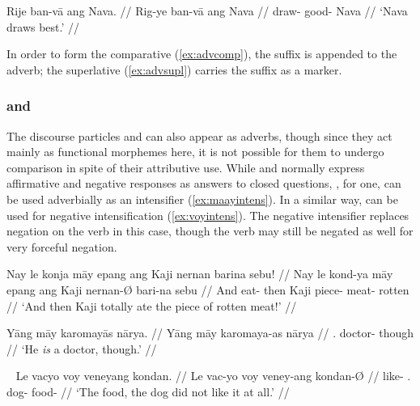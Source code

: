 \a\label{ex:advsupl}\begingl
	\gla Rije ban-vā ang Nava. //
	\glb Rig-ye ban-vā ang Nava //
	\glc draw-\TsgF{} good-\Supl{} \Aarg{} Nava //
	\glft `Nava draws best.' //
\endgl
\xe


In order to form the comparative (\ref{ex:advcomp}), the suffix 
 is appended to the adverb; the superlative (\ref{ex:advsupl}) 
carries the suffix  as a marker.

\subsubsection{ and }

The discourse particles  and  can 
also appear as adverbs, though since they act mainly as functional morphemes 
here, it is not possible for them to undergo comparison in spite of their 
attributive use. While  and  normally 
express affirmative and negative responses as answers to closed questions, 
, for one, can be used adverbially as an intensifier 
(\ref{ex:maayintens}). In a similar way,  can be used for 
negative intensification (\ref{ex:voyintens}). The negative intensifier 
replaces negation on the verb in this case, though the verb may still be 
negated as well for very forceful negation.

\pex\label{ex:maayintens}
\a\begingl
	\gla Nay le konja māy epang ang Kaji nernan barina sebu! //
	\glb Nay le kond-ya māy epang ang Kaji nernan-Ø bari-na sebu //
	\glc And \PatTI{} eat-\TsgM{} \Int{} then \Aarg{} Kaji piece-\Top{} 
		meat-\Gen{} rotten //
	\glft `And then Kaji totally ate the piece of rotten meat!' //
\endgl

\a\begingl
	\gla Yāng māy karomayās nārya. //
	\glb Yāng māy karomaya-as nārya //
	\glc \TsgM{}.\Aarg{} \Int{} doctor-\Parg{} though // 
	\glft `He \emph{is} a doctor, though.' //
\endgl
\xe

\pex~\label{ex:voyintens}
\a\begingl
	\gla Le vacyo voy veneyang kondan. //
	\glb Le vac-yo voy veney-ang kondan-Ø //
	\glc \PatTI{} like-\TsgN{} \Int{}.\Neg{} dog-\Aarg{} food-\Top{} //
	\glft `The food, the dog did not like it at all.' //
\endgl

